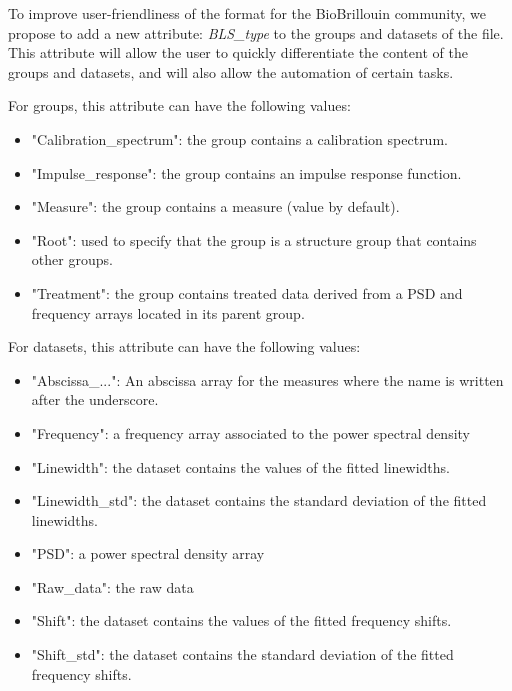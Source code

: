 To improve user-friendliness of the format for the BioBrillouin community, we propose to add a new attribute: \textit{BLS\_type} to the groups and datasets of the file. This attribute will allow the user to quickly differentiate the content of the groups and datasets, and will also allow the automation of certain tasks.

For groups, this attribute can have the following values:
\begin{itemize}
    \item "Calibration\_spectrum": the group contains a calibration spectrum.
    \item "Impulse\_response": the group contains an impulse response function.
    \item "Measure": the group contains a measure (value by default).
    \item "Root": used to specify that the group is a structure group that contains other groups.
    \item "Treatment": the group contains treated data derived from a PSD and frequency arrays located in its parent group.
\end{itemize}

For datasets, this attribute can have the following values:
\begin{itemize}
    \item "Abscissa\_...": An abscissa array for the measures where the name is written after the underscore.
    \item "Frequency": a frequency array associated to the power spectral density
    \item "Linewidth": the dataset contains the values of the fitted linewidths.
    \item "Linewidth\_std": the dataset contains the standard deviation of the fitted linewidths. 
    \item "PSD": a power spectral density array
    \item "Raw\_data": the raw data
    \item "Shift": the dataset contains the values of the fitted frequency shifts.
    \item "Shift\_std": the dataset contains the standard deviation of the fitted frequency shifts.
\end{itemize}



